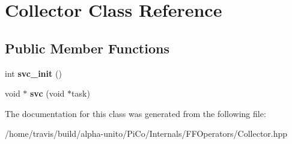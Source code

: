 \hypertarget{class_collector}{\section{\-Collector \-Class \-Reference}
\label{class_collector}
}
\subsection*{\-Public \-Member \-Functions}
\begin{DoxyCompactItemize}
\item 
\hypertarget{class_collector_a73d4be8c9cfac5b54c0b376bb3951175}{int {\bfseries svc\-\_\-init} ()}\label{class_collector_a73d4be8c9cfac5b54c0b376bb3951175}

\item 
\hypertarget{class_collector_a26fd5886929719be749dd53a77039ca0}{void $\ast$ {\bfseries svc} (void $\ast$task)}\label{class_collector_a26fd5886929719be749dd53a77039ca0}

\end{DoxyCompactItemize}


\-The documentation for this class was generated from the following file\-:\begin{DoxyCompactItemize}
\item 
/home/travis/build/alpha-\/unito/\-Pi\-Co/\-Internals/\-F\-F\-Operators/\-Collector.\-hpp\end{DoxyCompactItemize}
